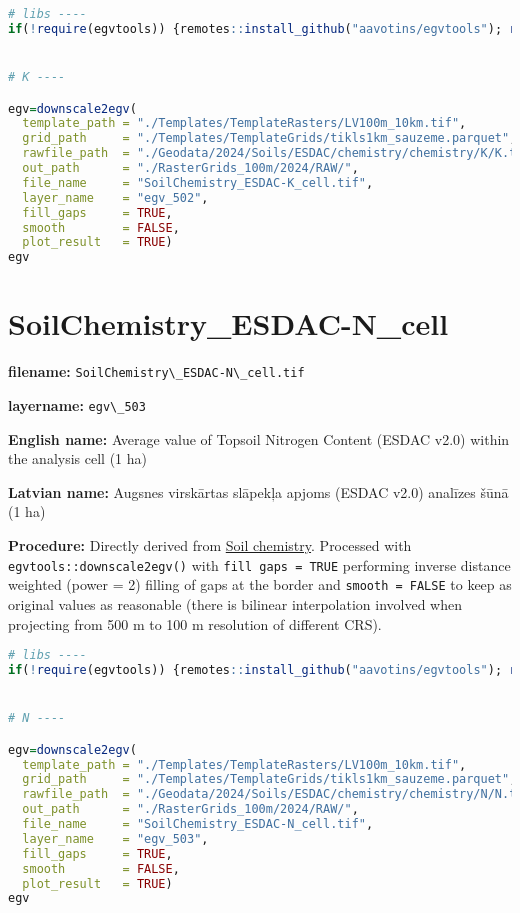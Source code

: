 \documentclass[
]{book}
\newcommand{\passthrough}[1]{#1}
\begin{document}
\begin{lstlisting}[language=R]
# libs ----
if(!require(egvtools)) {remotes::install_github("aavotins/egvtools"); require(egvtools)}


# K ----

egv=downscale2egv(
  template_path = "./Templates/TemplateRasters/LV100m_10km.tif",
  grid_path     = "./Templates/TemplateGrids/tikls1km_sauzeme.parquet",
  rawfile_path  = "./Geodata/2024/Soils/ESDAC/chemistry/chemistry/K/K.tif",
  out_path      = "./RasterGrids_100m/2024/RAW/",
  file_name     = "SoilChemistry_ESDAC-K_cell.tif",
  layer_name    = "egv_502",
  fill_gaps     = TRUE,
  smooth        = FALSE,
  plot_result   = TRUE)
egv
\end{lstlisting}

\section{SoilChemistry\_ESDAC-N\_cell}\label{ch06.503}

\textbf{filename:} \passthrough{\lstinline!SoilChemistry\_ESDAC-N\_cell.tif!}

\textbf{layername:} \passthrough{\lstinline!egv\_503!}

\textbf{English name:} Average value of Topsoil Nitrogen Content (ESDAC v2.0) within the analysis cell (1 ha)

\textbf{Latvian name:} Augsnes virskārtas slāpekļa apjoms (ESDAC v2.0) analīzes šūnā (1 ha)

\textbf{Procedure:} Directly derived from \hyperref[Ch04.07.01]{Soil chemistry}. Processed
with \passthrough{\lstinline!egvtools::downscale2egv()!} with \passthrough{\lstinline!fill gaps = TRUE!} performing inverse
distance weighted (power = 2) filling of gaps at the border and \passthrough{\lstinline!smooth = FALSE!}
to keep as original values as reasonable (there is bilinear interpolation
involved when projecting from 500 m to 100 m resolution of different CRS).

\begin{lstlisting}[language=R]
# libs ----
if(!require(egvtools)) {remotes::install_github("aavotins/egvtools"); require(egvtools)}


# N ----

egv=downscale2egv(
  template_path = "./Templates/TemplateRasters/LV100m_10km.tif",
  grid_path     = "./Templates/TemplateGrids/tikls1km_sauzeme.parquet",
  rawfile_path  = "./Geodata/2024/Soils/ESDAC/chemistry/chemistry/N/N.tif",
  out_path      = "./RasterGrids_100m/2024/RAW/",
  file_name     = "SoilChemistry_ESDAC-N_cell.tif",
  layer_name    = "egv_503",
  fill_gaps     = TRUE,
  smooth        = FALSE,
  plot_result   = TRUE)
egv
\end{lstlisting}
\end{document}
